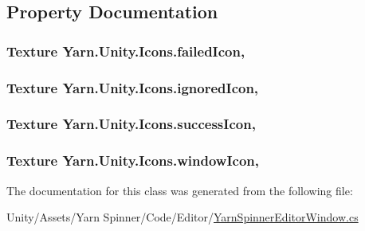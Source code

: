 \subsection{Property Documentation}
\hypertarget{a00042_aae7cc0e5016db04a90b2aa0e80957626}{
\subsubsection[{failed\-Icon}]{\setlength{\rightskip}{0pt plus 5cm}Texture Yarn.\-Unity.\-Icons.\-failed\-Icon\hspace{0.3cm}{\ttfamily [static]}, {\ttfamily [get]}}}\label{a00042_aae7cc0e5016db04a90b2aa0e80957626}
\hypertarget{a00042_a3f03f2f0fa137e349853d755e79f2e4a}{
\subsubsection[{ignored\-Icon}]{\setlength{\rightskip}{0pt plus 5cm}Texture Yarn.\-Unity.\-Icons.\-ignored\-Icon\hspace{0.3cm}{\ttfamily [static]}, {\ttfamily [get]}}}\label{a00042_a3f03f2f0fa137e349853d755e79f2e4a}
\hypertarget{a00042_aec8aea03eb6e31771ebc98e0611fff79}{
\subsubsection[{success\-Icon}]{\setlength{\rightskip}{0pt plus 5cm}Texture Yarn.\-Unity.\-Icons.\-success\-Icon\hspace{0.3cm}{\ttfamily [static]}, {\ttfamily [get]}}}\label{a00042_aec8aea03eb6e31771ebc98e0611fff79}
\hypertarget{a00042_aa78ab016ad041bc36850c8b20ba63972}{
\subsubsection[{window\-Icon}]{\setlength{\rightskip}{0pt plus 5cm}Texture Yarn.\-Unity.\-Icons.\-window\-Icon\hspace{0.3cm}{\ttfamily [static]}, {\ttfamily [get]}}}\label{a00042_aa78ab016ad041bc36850c8b20ba63972}


The documentation for this class was generated from the following file\-:\begin{DoxyCompactItemize}
\item 
Unity/\-Assets/\-Yarn Spinner/\-Code/\-Editor/\hyperlink{a00106}{Yarn\-Spinner\-Editor\-Window.\-cs}\end{DoxyCompactItemize}
